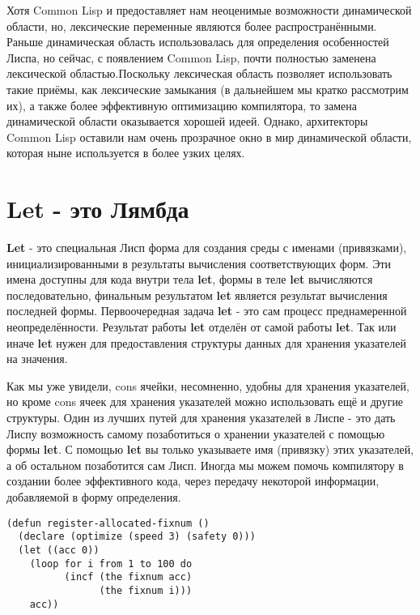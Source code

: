 Хотя Common Lisp и предоставляет нам неоценимые возможности динамической области, но, лексические переменные являются более распространёнными. Раньше динамическая область использовалась для определения особенностей Лиспа, но сейчас, с появлением Common Lisp, почти полностью заменена лексической областью.Поскольку лексическая область позволяет использовать такие приёмы, как лексические замыкания (в дальнейшем мы кратко рассмотрим их), а также более эффективную оптимизацию компилятора, то замена динамической области оказывается хорошей идеей. Однако, архитекторы Common Lisp оставили нам очень прозрачное окно в мир динамической области, которая ныне используется в более узких целях.

\section{Let - это Лямбда}\label{section_let_it_be_lambda}

\textbf{Let} - это специальная Лисп форма для создания среды с именами (привязками), инициализированными в результаты вычисления соответствующих форм. Эти имена доступны для кода внутри тела \textbf{let}, формы в теле \textbf{let} вычисляются последовательно, финальным результатом \textbf{let} является результат вычисления последней формы. Первоочередная задача \textbf{let} - это сам процесс преднамеренной неопределённости. Результат работы \textbf{let} отделён от самой работы \textbf{let}. Так или иначе \textbf{let} нужен для предоставления структуры данных для хранения указателей на значения.

Как мы уже увидели, cons ячейки, несомненно, удобны для хранения указателей, но кроме cons ячеек для хранения указателей можно использовать ещё и другие структуры. Один из лучших путей для хранения указателей в Лиспе - это дать Лиспу возможность самому позаботиться о хранении указателей с помощью формы \textbf{let}. С помощью \textbf{let} вы только указываете имя (привязку) этих указателей, а об остальном позаботится сам Лисп. Иногда мы можем помочь компилятору в создании более эффективного кода, через передачу некоторой информации, добавляемой в форму определения.

\begin{verbatim}
(defun register-allocated-fixnum ()
  (declare (optimize (speed 3) (safety 0)))
  (let ((acc 0))
    (loop for i from 1 to 100 do
          (incf (the fixnum acc)
                (the fixnum i)))
    acc))
\end{verbatim}

